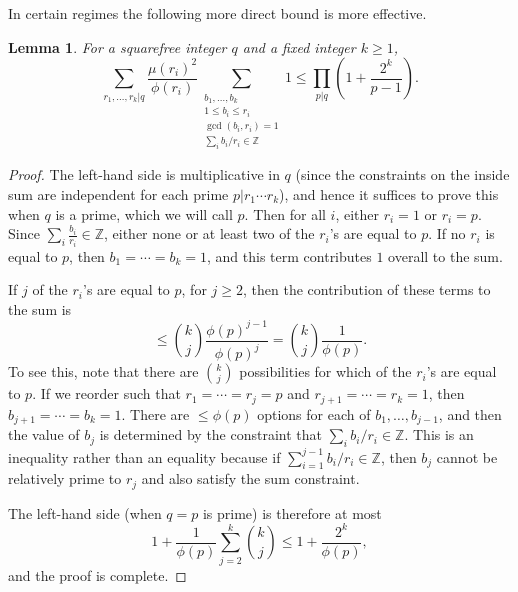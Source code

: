 \documentclass[11pt,letterpaper]{amsart}
\newcommand{\ogcd}[2]{\gcd(#1,#2)}
\newtheorem{lemma}{Lemma}
\theoremstyle{definition}
\begin{document}
In certain regimes the following more direct bound is more effective.
\begin{lemma}\label{lem:bounds-on-r-i-sums-no-Fs}
For a squarefree integer $q$ and a fixed integer $k \ge 1$,
\begin{equation*}
    \sum_{r_1, \dots, r_k |q} \frac{\mu(r_i)^2}{\phi(r_i)} \sum_{\substack{b_1, \dots, b_k \\ 1 \le b_i \le r_i \\ \ogcd{b_i}{r_i} = 1 \\ \sum_i b_i/r_i \in \mathbb Z }}1 \le \prod_{p|q} \left(1 + \frac{2^{k}}{p-1}\right).
\end{equation*}
\end{lemma}
\begin{proof}
The left-hand side is multiplicative in $q$ (since the constraints on the inside sum are independent for each prime $p|r_1 \cdots r_k$), and hence it suffices to prove this when $q$ is a prime, which we will call $p$. Then for all $i$, either $r_i = 1$ or $r_i = p$. Since $\sum_i \frac{b_i}{r_i} \in \mathbb Z$, either none or at least two of the $r_i$'s are equal to $p$. If no $r_i$ is equal to $p$, then $b_1 = \cdots = b_k = 1$, and this term contributes $1$ overall to the sum.

If $j$ of the $r_i$'s are equal to $p$, for $j \ge 2$, then the contribution of these terms to the sum is
\begin{equation*}
\le \binom{k}{j} \frac{\phi(p)^{j-1}}{\phi(p)^j} = \binom{k}{j} \frac 1{\phi(p)}.
\end{equation*}
To see this, note that there are $\binom{k}{j}$ possibilities for which of the $r_i$'s are equal to $p$. If we reorder such that $r_1 = \cdots = r_j = p$ and $r_{j+1} = \cdots = r_k = 1$, then $b_{j+1} = \cdots = b_k = 1$. There are $\le \phi(p)$ options for each of $b_1, \dots, b_{j-1}$, and then the value of $b_j$ is determined by the constraint that $\sum_i b_i/r_i \in \mathbb Z$. This is an inequality rather than an equality because if $\sum_{i=1}^{j-1} b_i/r_i \in \mathbb Z$, then $b_j$ cannot be relatively prime to $r_j$ and also satisfy the sum constraint.

The left-hand side (when $q=p$ is prime) is therefore at most
\begin{equation*}
1 + \frac 1{\phi(p)}\sum_{j=2}^k \binom{k}{j} \le 1 + \frac {2^k}{\phi(p)},
\end{equation*}
and the proof is complete.
\end{proof}
\end{document}

